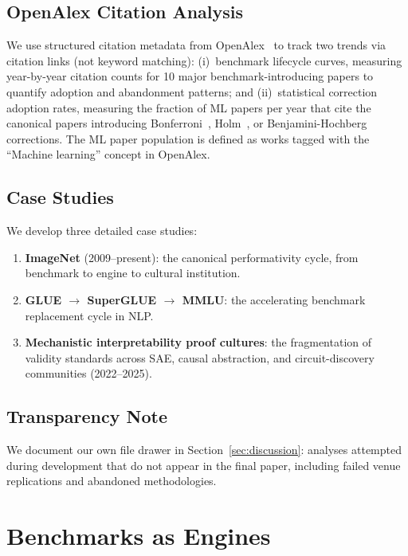 \documentclass{article}
\begin{document}
\subsection{OpenAlex Citation Analysis}

We use structured citation metadata from OpenAlex~\citep{priem_openalex_2022} to track two trends via citation links (not keyword matching): (i)~benchmark lifecycle curves, measuring year-by-year citation counts for 10 major benchmark-introducing papers to quantify adoption and abandonment patterns; and (ii)~statistical correction adoption rates, measuring the fraction of ML papers per year that cite the canonical papers introducing Bonferroni~\citep{dunn_1961}, Holm~\citep{holm_1979}, or Benjamini-Hochberg~\citep{benjamini_hochberg_1995} corrections. The ML paper population is defined as works tagged with the ``Machine learning'' concept in OpenAlex.

\subsection{Case Studies}

We develop three detailed case studies:
\begin{enumerate}[leftmargin=*]
  \item \textbf{ImageNet} (2009--present): the canonical performativity cycle, from benchmark to engine to cultural institution.
  \item \textbf{GLUE $\to$ SuperGLUE $\to$ MMLU}: the accelerating benchmark replacement cycle in NLP.
  \item \textbf{Mechanistic interpretability proof cultures}: the fragmentation of validity standards across SAE, causal abstraction, and circuit-discovery communities (2022--2025).
\end{enumerate}

\subsection{Transparency Note}

We document our own file drawer in Section~\ref{sec:discussion}: analyses attempted during development that do not appear in the final paper, including failed venue replications and abandoned methodologies.


\section{Benchmarks as Engines}
\label{sec:performativity}
\end{document}

